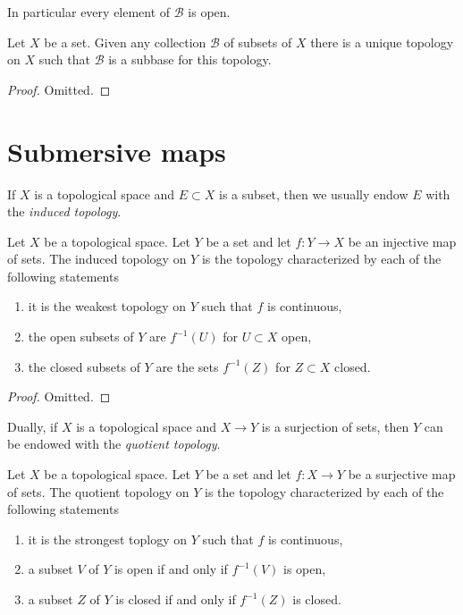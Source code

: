 \noindent
In particular every element of $\mathcal{B}$ is open.

\begin{lemma}
\label{lemma-subbase}
Let $X$ be a set. Given any collection $\mathcal{B}$ of subsets of $X$
there is a unique topology on $X$ such that $\mathcal{B}$ is a subbase
for this topology.
\end{lemma}

\begin{proof}
Omitted.
\end{proof}





\section{Submersive maps}
\label{section-submersive}

\noindent
If $X$ is a topological space and $E \subset X$ is a subset, then
we usually endow $E$ with the {\it induced topology}.

\begin{lemma}
\label{lemma-induced}
Let $X$ be a topological space. Let $Y$ be a set and let
$f : Y \to X$ be an injective map of sets. The induced
topology on $Y$ is the topology characterized by
each of the following statements
\begin{enumerate}
\item it is the weakest topology on $Y$ such that $f$ is continuous,
\item the open subsets of $Y$ are $f^{-1}(U)$ for $U \subset X$ open,
\item the closed subsets of $Y$ are the sets $f^{-1}(Z)$ for $Z \subset X$
closed.
\end{enumerate}
\end{lemma}

\begin{proof}
Omitted.
\end{proof}

\noindent
Dually, if $X$ is a topological space and $X \to Y$ is a surjection of
sets, then $Y$ can be endowed with the {\it quotient topology}.

\begin{lemma}
\label{lemma-quotient}
Let $X$ be a topological space. Let $Y$ be a set and let $f : X \to Y$
be a surjective map of sets. The quotient topology on $Y$ is the
topology characterized by each of the following statements
\begin{enumerate}
\item it is the strongest toplogy on $Y$ such that $f$ is continuous,
\item a subset $V$ of $Y$ is open if and only if $f^{-1}(V)$ is open,
\item a subset $Z$ of $Y$ is closed if and only if $f^{-1}(Z)$ is closed.
\end{enumerate}
\end{lemma}

